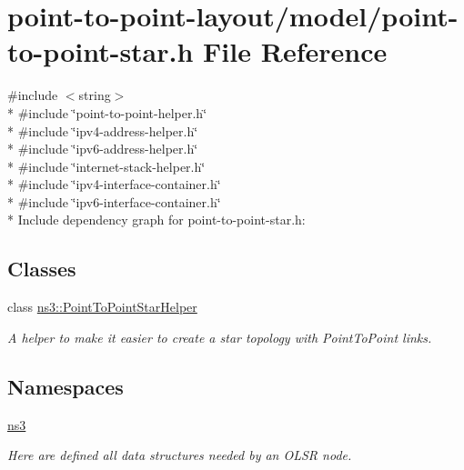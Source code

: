 \hypertarget{point-to-point-star_8h}{}\section{point-\/to-\/point-\/layout/model/point-\/to-\/point-\/star.h File Reference}
\label{point-to-point-star_8h}
{\ttfamily \#include $<$string$>$}\\*
{\ttfamily \#include \char`\"{}point-\/to-\/point-\/helper.\+h\char`\"{}}\\*
{\ttfamily \#include \char`\"{}ipv4-\/address-\/helper.\+h\char`\"{}}\\*
{\ttfamily \#include \char`\"{}ipv6-\/address-\/helper.\+h\char`\"{}}\\*
{\ttfamily \#include \char`\"{}internet-\/stack-\/helper.\+h\char`\"{}}\\*
{\ttfamily \#include \char`\"{}ipv4-\/interface-\/container.\+h\char`\"{}}\\*
{\ttfamily \#include \char`\"{}ipv6-\/interface-\/container.\+h\char`\"{}}\\*
Include dependency graph for point-\/to-\/point-\/star.h\+:
\subsection*{Classes}
\begin{DoxyCompactItemize}
\item 
class \hyperlink{classns3_1_1PointToPointStarHelper}{ns3\+::\+Point\+To\+Point\+Star\+Helper}
\begin{DoxyCompactList}\small\item\em A helper to make it easier to create a star topology with Point\+To\+Point links. \end{DoxyCompactList}\end{DoxyCompactItemize}
\subsection*{Namespaces}
\begin{DoxyCompactItemize}
\item 
 \hyperlink{namespacens3}{ns3}
\begin{DoxyCompactList}\small\item\em Here are defined all data structures needed by an O\+L\+SR node. \end{DoxyCompactList}\end{DoxyCompactItemize}
